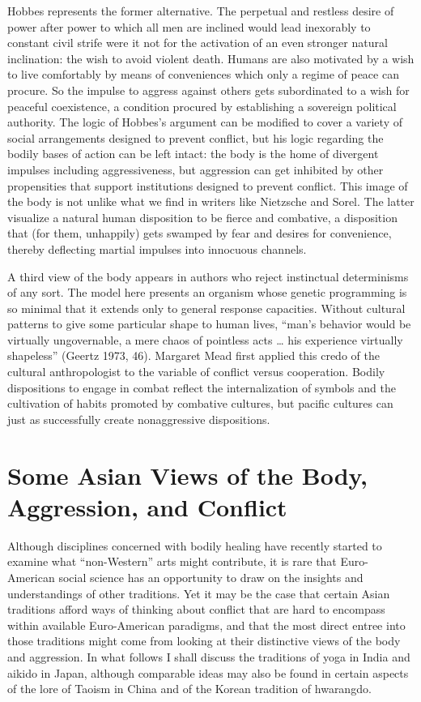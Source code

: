 Hobbes represents the former alternative. The perpetual and restless desire of power after power to which all men are inclined would lead inexorably to constant civil strife were it not for the activation of an even stronger natural inclination: the wish to avoid violent death. Humans are also motivated by a wish to live comfortably by means of conveniences which only a regime of peace can procure. So the impulse to aggress against others gets subordinated to a wish for peaceful coexistence, a condition procured by establishing a sovereign political authority. The logic of Hobbes's argument can be modified to cover a variety of social arrangements designed to prevent conflict, but his logic regarding the bodily bases of action can be left intact: the body is the home of divergent impulses including aggressiveness, but aggression can get inhibited by other propensities that support institutions designed to prevent conflict. This image of the body is not unlike what we find in writers like Nietzsche and Sorel. The latter visualize a natural human disposition to be fierce and combative, a disposition that (for them, unhappily) gets swamped by fear and desires for convenience, thereby deflecting martial impulses into innocuous channels. 

A third view of the body appears in authors who reject instinctual determinisms of any sort. The model here presents an organism whose genetic programming is so minimal that it extends only to general response capacities. Without cultural patterns to give some particular shape to human lives, ``man's behavior would be virtually ungovernable, a mere chaos of pointless acts \ldots{} his experience virtually shapeless'' (Geertz 1973, 46). Margaret Mead first applied this credo of the cultural anthropologist to the variable of conflict versus cooperation. Bodily dispositions to engage in combat reflect the internalization of symbols and the cultivation of habits promoted by combative cultures, but pacific cultures can just as successfully create nonaggressive dispositions.

\section*{Some Asian Views of the Body, Aggression, and Conflict}

Although disciplines concerned with bodily healing have recently started to examine what ``non-Western'' arts might contribute, it is rare that Euro-American social science has an opportunity to draw on the insights and understandings of other traditions. Yet it may be the case that certain Asian traditions afford ways of thinking about conflict that are hard to encompass within available Euro-American paradigms, and that the most direct entree into those traditions might come from looking at their distinctive views of the body and aggression. In what follows I shall discuss the traditions of yoga in India and aikido in Japan, although comparable ideas may also be found in certain aspects of the lore of Taoism in China and of the Korean tradition of hwarangdo. 


